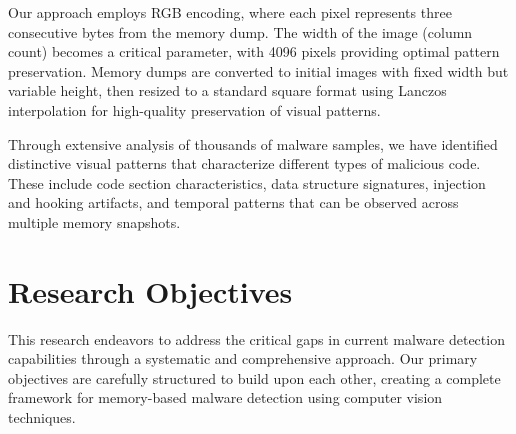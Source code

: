 Our approach employs RGB encoding, where each pixel represents three consecutive bytes from the memory dump. The width of the image (column count) becomes a critical parameter, with 4096 pixels providing optimal pattern preservation. Memory dumps are converted to initial images with fixed width but variable height, then resized to a standard square format using Lanczos interpolation for high-quality preservation of visual patterns.

Through extensive analysis of thousands of malware samples, we have identified distinctive visual patterns that characterize different types of malicious code. These include code section characteristics, data structure signatures, injection and hooking artifacts, and temporal patterns that can be observed across multiple memory snapshots.

\section{Research Objectives}
\label{sec:objectives}

This research endeavors to address the critical gaps in current malware detection capabilities through a systematic and comprehensive approach. Our primary objectives are carefully structured to build upon each other, creating a complete framework for memory-based malware detection using computer vision techniques.

